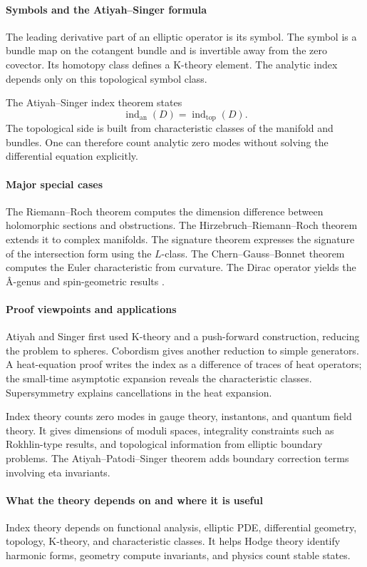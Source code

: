 \paragraph{Symbols and the Atiyah--Singer formula}
The leading derivative part of an elliptic operator is its symbol. The symbol is a bundle map on the cotangent bundle and is invertible away from the zero covector. Its homotopy class defines a K-theory element. The analytic index depends only on this topological symbol class.

The Atiyah--Singer index theorem states
\[
\operatorname{ind}_{\mathrm{an}}(D)=\operatorname{ind}_{\mathrm{top}}(D).
\]
The topological side is built from characteristic classes of the manifold and bundles. One can therefore count analytic zero modes without solving the differential equation explicitly.

\paragraph{Major special cases}
The Riemann--Roch theorem computes the dimension difference between holomorphic sections and obstructions. The Hirzebruch--Riemann--Roch theorem extends it to complex manifolds. The signature theorem expresses the signature of the intersection form using the $L$-class. The Chern--Gauss--Bonnet theorem computes the Euler characteristic from curvature. The Dirac operator yields the Â-genus and spin-geometric results \cite{index_theory_ref3}.

\paragraph{Proof viewpoints and applications}
Atiyah and Singer first used K-theory and a push-forward construction, reducing the problem to spheres. Cobordism gives another reduction to simple generators. A heat-equation proof writes the index as a difference of traces of heat operators; the small-time asymptotic expansion reveals the characteristic classes. Supersymmetry explains cancellations in the heat expansion.

Index theory counts zero modes in gauge theory, instantons, and quantum field theory. It gives dimensions of moduli spaces, integrality constraints such as Rokhlin-type results, and topological information from elliptic boundary problems. The Atiyah--Patodi--Singer theorem adds boundary correction terms involving eta invariants.

\paragraph{What the theory depends on and where it is useful}
Index theory depends on functional analysis, elliptic PDE, differential geometry, topology, K-theory, and characteristic classes. It helps Hodge theory identify harmonic forms, geometry compute invariants, and physics count stable states.

